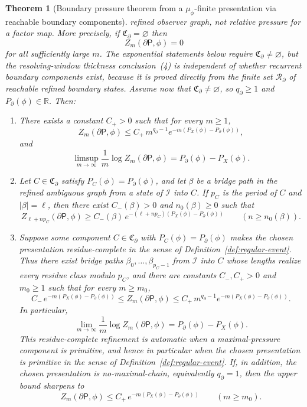 \documentclass{etds}%
\numberwithin{equation}{section}
\theoremstyle{plain}
\newtheorem{theorem}{Theorem}[section]
\theoremstyle{definition}
\theoremstyle{remark}
\begin{document}
\begin{theorem}[Boundary pressure theorem from a $\mu_\phi$-finite presentation via reachable boundary components]
refined observer graph, not relative pressure for a factor map.  More
precisely, if $\mathfrak{C}_\partial=\varnothing$ then
\[
Z_m(\partial\mathsf{P},\phi)=0
\]
for all sufficiently large $m$.  The exponential statements below require
$\mathfrak{C}_\partial\neq\varnothing$, but the resolving-window thickness
conclusion~\emph{(4)} is independent of whether recurrent boundary components
exist, because it is proved directly from the finite set
$\mathcal{R}_\partial$ of reachable refined boundary states.  Assume now that
$\mathfrak{C}_\partial\neq\varnothing$, so $q_\partial\ge 1$ and
$P_\partial(\phi)\in\mathbb{R}$.  Then:
\begin{enumerate}[label=(\arabic*)]
\item There exists a constant $C_+>0$ such that for every $m\ge 1$,
  \[
  Z_m(\partial\mathsf{P},\phi)\le
  C_+\,m^{q_\partial-1}e^{-m(P_X(\phi)-P_\partial(\phi))},
  \]
  and
  \[
  \limsup_{m\to\infty}\frac1m\log Z_m(\partial\mathsf{P},\phi)
  =P_\partial(\phi)-P_X(\phi).
  \]
\item Let $C\in\mathfrak{C}_\partial$ satisfy $P_C(\phi)=P_\partial(\phi)$, and
  let $\beta$ be a bridge path in the refined ambiguous graph from a state of
  $\mathcal{I}$ into $C$.  If $p_C$ is the period of $C$ and $|\beta|=\ell$,
  then there exist $C_-(\beta)>0$ and $n_0(\beta)\ge 0$ such that
  \[
  Z_{\ell+np_C}(\partial\mathsf{P},\phi)
  \ge C_-(\beta)\,
  e^{-(\ell+np_C)(P_X(\phi)-P_\partial(\phi))}
  \qquad(n\ge n_0(\beta)).
  \]
\item Suppose some component $C\in\mathfrak{C}_\partial$ with
  $P_C(\phi)=P_\partial(\phi)$ makes the chosen presentation
  residue-complete in the sense of Definition~\ref{def:regular-event}.  Thus
  there exist bridge paths $\beta_0,\dots,\beta_{p_C-1}$ from
  $\mathcal{I}$ into $C$ whose lengths realize every residue class modulo
  $p_C$, and there are constants
  $C_-,C_+>0$ and $m_0\ge 1$ such that for every $m\ge m_0$,
  \[
  C_-\,e^{-m(P_X(\phi)-P_\partial(\phi))}
  \le Z_m(\partial\mathsf{P},\phi)
  \le
  C_+\,m^{q_\partial-1}e^{-m(P_X(\phi)-P_\partial(\phi))}.
  \]
  In particular,
  \[
  \lim_{m\to\infty}\frac1m\log Z_m(\partial\mathsf{P},\phi)
  =P_\partial(\phi)-P_X(\phi).
  \]
  This residue-complete refinement is automatic when a maximal-pressure
  component is primitive, and hence in particular when the chosen
  presentation is primitive in the sense of
  Definition~\ref{def:regular-event}.  If, in addition, the chosen
  presentation is no-maximal-chain, equivalently $q_\partial=1$, then the
  upper bound sharpens to
  \[
  Z_m(\partial\mathsf{P},\phi)\le
  C_+\,e^{-m(P_X(\phi)-P_\partial(\phi))}
  \qquad(m\ge m_0).
  \]
\end{enumerate}


\end{theorem}
\end{document}
